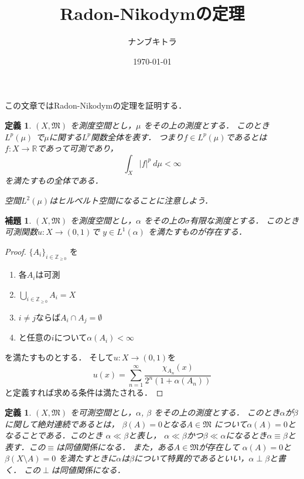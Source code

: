 \documentclass[leqno, a4paper, 12pt]{jsarticle}
\title{Radon-Nikodymの定理}
\author{ナンブキトラ}
\date{\today}
\newtheorem{lem}[thm]{補題}
\newtheorem{df}[thm]{定義}
\newcommand{\zz}{\mathbb{Z}}
\newcommand{\rr}{\mathbb{R}}
\begin{document}
\maketitle

この文章ではRadon-Nikodymの定理を証明する．

\begin{df}
$(X, \mathfrak{M})$
を測度空間とし，$\mu$
をその上の測度とする．
このとき
$L^{p}(\mu)$
で$\mu$に関する$L^{p}$関数全体を表す．
つまり$f\in L^{p}(\mu)$であるとは
$f: X\to \rr$であって可測であり，
\[
\int_{X} |f|^{p}\ d\mu<\infty
\]
を満たすもの全体である．

空間$L^{2}(\mu)$はヒルベルト空間になることに注意しよう．
\end{df}


\begin{lem}\label{lem:lemlem}
$(X, \mathfrak{M})$
を測度空間とし，$\alpha$
をその上の$\sigma$有限な測度とする．
このとき可測関数$u: X\to (0, 1)$で
$y\in L^{1}(\alpha)$
を満たすものが存在する．
\end{lem}
\begin{proof}

$\{A_{i}\}_{i\in \zz_{\ge 0}}$
を
\begin{enumerate}
\item 各$A_{i}$は可測
\item 
$\bigcup_{i\in \zz_{\ge 0}}A_{i}=X$
\item $i\neq j$ならば$A_{i}\cap A_{j}=\emptyset$
\item 
と任意の$i$について$\alpha(A_{i})<\infty$
\end{enumerate}
を満たすものとする．
そして$u: X\to (0, 1)$を
\[
u(x)=\sum_{n=1}^{\infty}\frac{\chi_{A_{n}}(x)}{2^{n}(1+\alpha(A_{n}))}
\]
と定義すれば求める条件は満たされる．
\end{proof}

\begin{df}
$(X, \mathfrak{M})$
を可測空間とし，$\alpha$, $\beta$
をその上の測度とする．
このとき$\alpha$が$\beta$に関して絶対連続であるとは，
$\beta(A)=0$となる$A\in \mathfrak{M}$
について$\alpha(A)=0$となることである．このとき
$\alpha\ll \beta$と表し，
$\alpha\ll\beta$かつ$\beta\ll\alpha$になるとき$\alpha \equiv \beta$と表す．この$\equiv$は同値関係になる．
また，ある$A\in \mathfrak{M}$が存在して
$\alpha(A)=0$と$\beta(X\setminus A)=0$
を満たすときに$\alpha$は$\beta$について特異的であるといい，$\alpha \perp \beta$と書く．
この$\perp$は同値関係になる．
\end{df}
\end{document}
